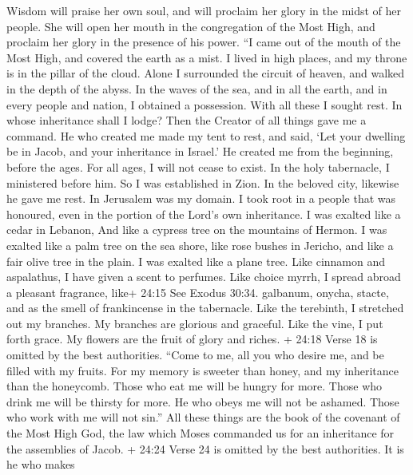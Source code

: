  Wisdom will praise her own soul, and will proclaim her
glory in the midst of her people.  She will open her mouth
in the congregation of the Most High, and proclaim her glory in the
presence of his power.  ``I came out of the mouth of the
Most High, and covered the earth as a mist.  I lived in high
places, and my throne is in the pillar of the cloud.  Alone
I surrounded the circuit of heaven, and walked in the depth of the
abyss.  In the waves of the sea, and in all the earth, and
in every people and nation, I obtained a possession.  With
all these I sought rest. In whose inheritance shall I lodge?
 Then the Creator of all things gave me a command. He who
created me made my tent to rest, and said, `Let your dwelling be in
Jacob, and your inheritance in Israel.'  He created me from
the beginning, before the ages. For all ages, I will not cease to exist.
 In the holy tabernacle, I ministered before him. So I was
established in Zion.  In the beloved city, likewise he gave
me rest. In Jerusalem was my domain.  I took root in a
people that was honoured, even in the portion of the Lord's own
inheritance.  I was exalted like a cedar in Lebanon, And
like a cypress tree on the mountains of Hermon.  I was
exalted like a palm tree on the sea shore, like rose bushes in Jericho,
and like a fair olive tree in the plain. I was exalted like a plane
tree.  Like cinnamon and aspalathus, I have given a scent
to perfumes. Like choice myrrh, I spread abroad a pleasant fragrance,
like+ 24:15 See Exodus 30:34. galbanum, onycha, stacte, and as the smell
of frankincense in the tabernacle.  Like the terebinth, I
stretched out my branches. My branches are glorious and graceful.
 Like the vine, I put forth grace. My flowers are the fruit
of glory and riches.  + 24:18 Verse 18 is omitted by the
best authorities.  ``Come to me, all you who desire me, and
be filled with my fruits.  For my memory is sweeter than
honey, and my inheritance than the honeycomb.  Those who
eat me will be hungry for more. Those who drink me will be thirsty for
more.  He who obeys me will not be ashamed. Those who work
with me will not sin.''  All these things are the book of
the covenant of the Most High God, the law which Moses commanded us for
an inheritance for the assemblies of Jacob.  + 24:24 Verse
24 is omitted by the best authorities.  It is he who makes
